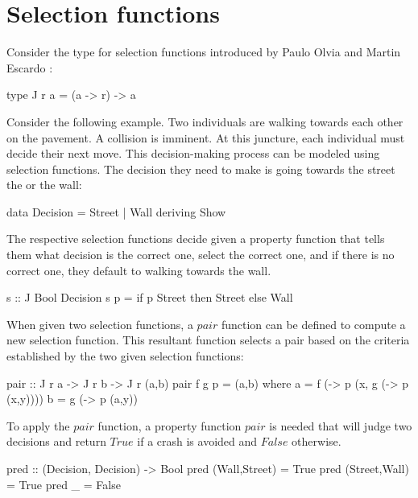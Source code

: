 \documentclass[runningheads]{llncs}
\begin{document}
\section{Selection functions}\label{selection-functions}

Consider the type for selection functions introduced by Paulo Olvia and
Martin Escardo \cite{escardo2010selection} :

\begin{code}
type J r a = (a -> r) -> a
\end{code}

Consider the following example. Two individuals are walking towards each
other on the pavement. A collision is imminent. At this juncture, each
individual must decide their next move. This decision-making process can
be modeled using selection functions. The decision they need to make is
going towards the street the or the wall:

\begin{code}
data Decision = Street | Wall deriving Show
\end{code}

The respective selection functions decide given a property function that
tells them what decision is the correct one, select the correct one, and
if there is no correct one, they default to walking towards the wall.

\begin{code}
s :: J Bool Decision
s p = if p Street then Street else Wall
\end{code}

When given two selection functions, a \(pair\) function can be defined
to compute a new selection function. This resultant function selects a
pair based on the criteria established by the two given selection
functions:

\begin{code}
pair :: J r a -> J r b -> J r (a,b)
pair f g p = (a,b)
  where
      a = f (\x -> p (x, g (\y -> p (x,y))))
      b = g (\y -> p (a,y))
\end{code}

To apply the \(pair\) function, a property function \(pair\) is needed
that will judge two decisions and return \(True\) if a crash is avoided
and \(False\) otherwise.

\begin{code}
pred :: (Decision, Decision) -> Bool
pred (Wall,Street) = True
pred (Street,Wall) = True
pred _             = False
\end{code}
\end{document}

